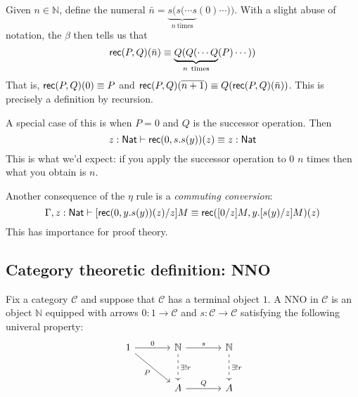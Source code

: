 \documentclass[12pt]{article}
\begin{document}
Given $n \in \mathbb{N}$, define the numeral $\bar n = \underbrace{s(s(\cdots s}_{n\ \text{times}}(0) \cdots ))$. With a slight abuse of notation, the $\beta$ then tells us that
\begin{equation*}
\mathsf{rec}(P,Q)(\bar n) \equiv \underbrace{Q(Q(\cdots Q}_{n\ \text{times}}(P) \cdots))
\end{equation*}
That is, $\mathsf{rec}(P,Q)(0) \equiv P$ and $\mathsf{rec}(P,Q)(\overline{n+1}) \equiv Q(\mathsf{rec}(P,Q)(\bar n))$. This is precisely a definition by recursion.

A special case of this is when $P=0$ and $Q$ is the successor operation. Then
\begin{equation*}
z : \mathsf{Nat} \vdash \mathsf{rec}(0,s.s(y))(z) \equiv z : \mathsf{Nat}
\end{equation*}
This is what we'd expect: if you apply the successor operation to $0$ $n$ times then what you obtain is $n$.

Another consequence of the $\eta$ rule is a \emph{commuting conversion}:
\begin{equation*}
    \Gamma, z : \mathsf{Nat} \vdash [\mathsf{rec}(0,y.s(y))(z)/z]M \equiv \mathsf{rec}([0/z]M, y.[s(y)/z]M)(z)
\end{equation*}
This has importance for proof theory.

\subsection{Category theoretic definition: NNO}
Fix a category $\mathcal{C}$ and suppose that $\mathcal{C}$ has a terminal object $1$. A \acl{NNO} in $\mathcal{C}$ is an object $\mathbb{N}$ equipped with arrows $0 : 1 \to \mathcal{C}$ and $s : \mathcal{C} \to \mathcal{C}$ satisfying the following univeral property:
\[
\begin{tikzcd}[column sep=large,row sep=large]
1\rar{0}\drar[swap]{P} & \mathbb{N}\rar{s}\dar[dashed]{{\exists!}r} & \mathbb{N}\dar[dashed]{{\exists!}r}	\\
{} & A\rar{Q} & A
\end{tikzcd}
\]
\end{document}

